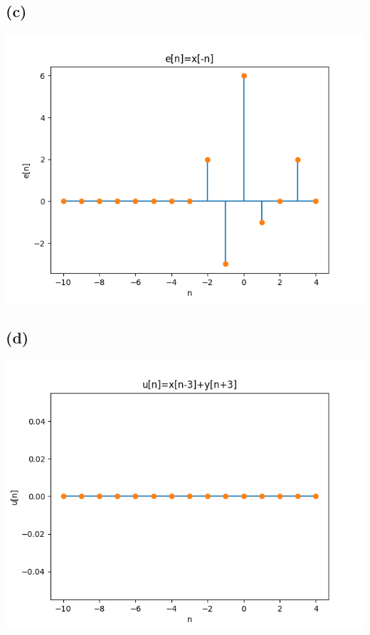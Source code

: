 \subsection*{(c)}
\includegraphics[scale=0.5]{e.png}
\subsection*{(d)}
\includegraphics[scale=0.5]{u.png}
